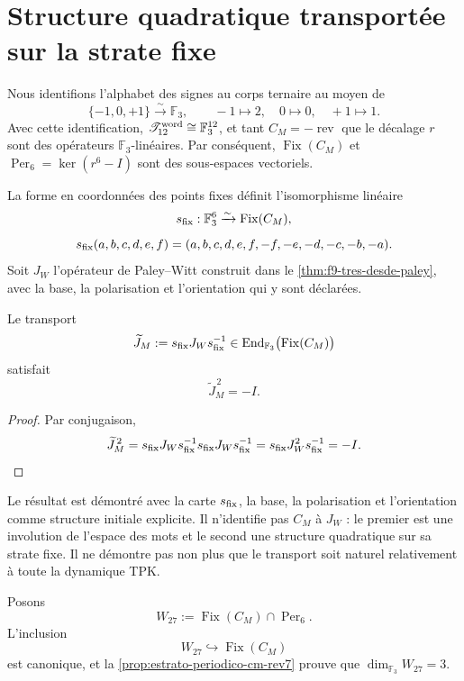 \section{Structure quadratique transportée sur la strate fixe}
\label{sec:estructura-cuadratica-estrato-fijo-cm}

Nous identifions l’alphabet des signes au corps ternaire au moyen de
\[
 \{-1,0,+1\}\xrightarrow{\sim}\mathbb F_3,
 \qquad
 -1\longmapsto2,\quad 0\longmapsto0,\quad +1\longmapsto1.
\]
Avec cette identification, \(\mathscr T_{12}^{\rm word}\cong\mathbb F_3^{12}\), et tant \(C_M=-\operatorname{rev}\) que le décalage \(r\) sont des opérateurs \(\mathbb F_3\)-linéaires. Par conséquent, \(\operatorname{Fix}(C_M)\) et \(\operatorname{Per}_6=\ker(r^6-I)\) sont des sous-espaces vectoriels.

La forme en coordonnées des points fixes définit l’isomorphisme linéaire
\[
 s_{\rm fix}:\mathbb F_3^6\xrightarrow{\sim}\operatorname{Fix}(C_M),
\]
\[
 s_{\rm fix}(a,b,c,d,e,f)
 =(a,b,c,d,e,f,-f,-e,-d,-c,-b,-a).
\]
Soit \(J_W\) l’opérateur de Paley--Witt construit dans le \cref{thm:f9-tres-desde-paley}, avec la base, la polarisation et l’orientation qui y sont déclarées.

\begin{proposition}[Structure complexe \(\widetilde J_M^{\,2}=-I\) sur la strate fixe]
\label{prop:raiz-menos-uno-estrato-fijo-cm} Le transport
\[
\widetilde J_M:=s_{\rm fix}J_Ws_{\rm fix}^{-1}
\in\operatorname{End}_{\mathbb F_3}
   \bigl(\operatorname{Fix}(C_M)\bigr)
\]
satisfait
\[
 \widetilde J_M^{\,2}=-I.
\]
\end{proposition}

\begin{proof}
Par conjugaison,
\[
 \widetilde J_M^{\,2}
 =s_{\rm fix}J_Ws_{\rm fix}^{-1}
  s_{\rm fix}J_Ws_{\rm fix}^{-1}
 =s_{\rm fix}J_W^2s_{\rm fix}^{-1}
 =-I.
\]
\end{proof}

Le résultat est démontré avec la carte \(s_{\rm fix}\), la base, la polarisation et l’orientation comme structure initiale explicite. Il n’identifie pas \(C_M\) à \(J_W\) : le premier est une involution de l’espace des mots et le second une structure quadratique sur sa strate fixe. Il ne démontre pas non plus que le transport soit naturel relativement à toute la dynamique TPK.

Posons
\[
 W_{27}
 :=\operatorname{Fix}(C_M)\cap\operatorname{Per}_6.
\]
L’inclusion
\[
 W_{27}\hookrightarrow\operatorname{Fix}(C_M)
\]
est canonique, et la \cref{prop:estrato-periodico-cm-rev7} prouve que \(\dim_{\mathbb F_3}W_{27}=3\).

